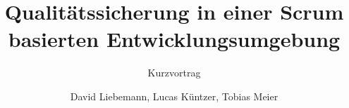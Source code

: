 \documentclass{beamer}
\title{Qualitätssicherung in einer Scrum basierten Entwicklungsumgebung}
\subtitle{Kurzvortrag}
\author{David Liebemann, Lucas Küntzer, Tobias Meier}
\institute{Fachhochschule Trier}
\begin{document}
\begin{frame}
\titlepage
\end{frame}

\begin{frame}

\end{frame}
\end{document}
